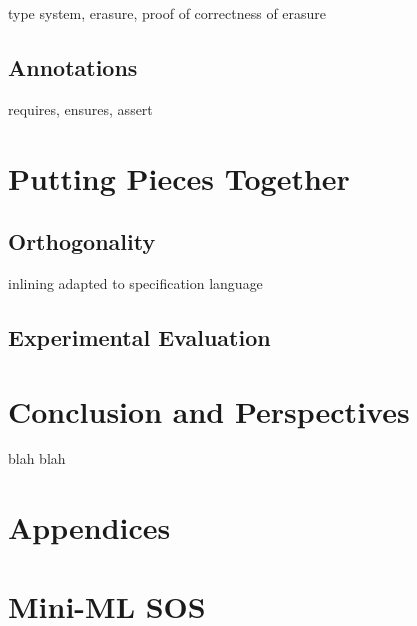 \documentclass[a4paper,11pt,oneside]{article}
\theoremstyle{plain}
\begin{document}
type system, erasure, proof of correctness of erasure

\subsection{Annotations}

requires, ensures, assert

\section{Putting Pieces Together}

\subsection{Orthogonality}

inlining adapted to specification language

\subsection{Experimental Evaluation}

\section{Conclusion and Perspectives}

blah blah

\newpage
\section*{Appendices}
\newpage
\appendix
\section{Mini-ML SOS}
\end{document}
